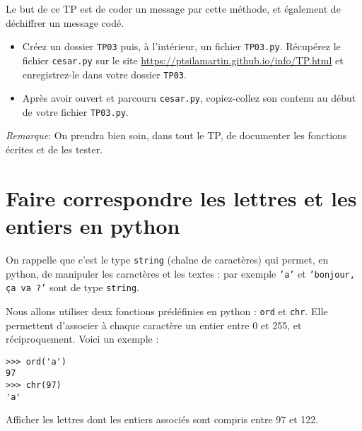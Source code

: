 Le but de ce TP est de coder un message par cette méthode, et également de déchiffrer un message codé. 
\bigskip
\begin{itemize}
\item[\textbullet] Créez un dossier \texttt{TP03} puis, à l'intérieur, un fichier \texttt{TP03.py}. 
Récupérez  le fichier \texttt{cesar.py} sur le site \url{https://ptsilamartin.github.io/info/TP.html}  et enregistrez-le dans votre dossier \texttt{TP03}.
\item[\textbullet] Après avoir ouvert et parcouru \texttt{cesar.py}, copiez-collez son contenu au début de votre fichier \texttt{TP03.py}.
\end{itemize}

\bigskip
%

\emph{Remarque}: On prendra bien soin, dans tout le TP, de documenter les fonctions écrites et de les tester.



\section{Faire correspondre les lettres et les entiers en python}

On rappelle que c'est le type \texttt{string} (chaîne de caractères) qui permet, en python, de manipuler les caractères et les textes : par exemple \texttt{'a'} et \texttt{'bonjour, ça va ?'} sont de type \texttt{string}.

Nous allons utiliser deux fonctions prédéfinies en python : \texttt{ord} et \texttt{chr}. Elle permettent d'associer à chaque caractère un entier entre 0 et 255, et réciproquement.  Voici un exemple :
\begin{lstlisting}
>>> ord('a')
97
>>> chr(97)
'a'
\end{lstlisting}


\begin{question}
Afficher les lettres dont les entiers associés sont compris entre 97 et 122.
\end{question}


